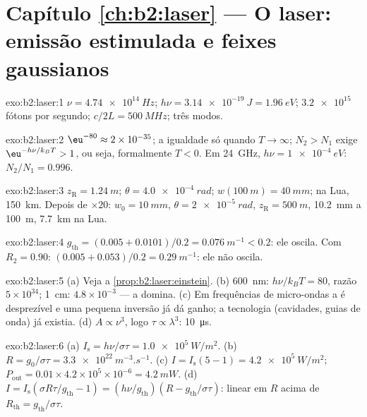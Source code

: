 \section*{Capítulo \ref{ch:b2:laser} --- O laser: emissão estimulada e feixes gaussianos}

\begin{solution}{exo:b2:laser:1}
$\nu = \qty{4.74e14}{Hz}$; $h\nu = \qty{3.14e-19}{J} = \qty{1.96}{eV}$;
$\qty{3.2e15}{}$ fótons por segundo; $c/2L = \qty{500}{MHz}$; três
modos.
\end{solution}

\begin{solution}{exo:b2:laser:2}
$\eu^{-80} \approx 2 \times 10^{-35}$; a igualdade só quando $T \to \infty$;
$N_2 > N_1$ exige $\eu^{-h\nu/k_BT} > 1$, ou seja, formalmente $T < 0$. Em
\qty{24}{GHz}, $h\nu = \qty{1e-4}{eV}$: $N_2/N_1 = 0.996$.
\end{solution}

\begin{solution}{exo:b2:laser:3}
$z_{\text{R}} = \qty{1.24}{m}$; $\theta = \qty{4.0e-4}{rad}$; $w(\qty{100}{m}) =
\qty{40}{mm}$; na Lua, \qty{150}{km}. Depois de $\times 20$: $w_0 = \qty{10}{mm}$,
$\theta = \qty{2e-5}{rad}$, $z_{\text{R}} = \qty{500}{m}$, \qty{10.2}{mm} a
\qty{100}{m}, \qty{7.7}{km} na Lua.
\end{solution}

\begin{solution}{exo:b2:laser:4}
$g_{\text{th}} = (0.005 + 0.0101)/0.2 = \qty{0.076}{m^{-1}} < 0.2$: ele
oscila. Com $R_2 = 0.90$: $(0.005 + 0.053)/0.2 = \qty{0.29}{m^{-1}}$: ele
não oscila.
\end{solution}

\begin{solution}{exo:b2:laser:5}
(a) Veja a \cref{prop:b2:laser:einstein}. (b) \qty{600}{nm}: $h\nu/k_BT
= 80$, razão $5 \times 10^{34}$; \qty{1}{cm}: $4.8 \times 10^{-3}$ ---
a  domina. (c) Em frequências de micro-ondas
a  é desprezível e uma pequena inversão já dá
ganho; a tecnologia (cavidades, guias de onda) já existia. (d) $A \propto
\nu^3$, logo $\tau \propto \lambda^3$: \qty{10}{\micro s}.
\end{solution}

\begin{solution}{exo:b2:laser:6}
(a) $I_{\text{s}} = h\nu/\sigma\tau = \qty{1.0e5}{W/m^2}$. (b) $R =
g_0/\sigma\tau = \qty{3.3e22}{m^{-3}.s^{-1}}$. (c) $I = I_{\text{s}}(5 - 1) =
\qty{4.2e5}{W/m^2}$; $P_{\text{out}} = 0.01 \times 4.2 \times 10^5 \times
10^{-6} = \qty{4.2}{mW}$. (d) $I = I_{\text{s}}(\sigma R\tau/g_{\text{th}}
- 1) = (h\nu/g_{\text{th}})(R - g_{\text{th}}/\sigma\tau)$: linear em $R$
acima de $R_{\text{th}} = g_{\text{th}}/\sigma\tau$.
\end{solution}

